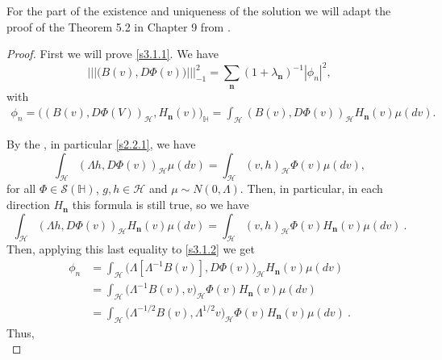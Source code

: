 \documentclass[review,onefignum,onetabnum]{siamart190516}
\begin{document}
        For the part of the existence and uniqueness of the solution we will 
    adapt the proof of the Theorem 5.2 in Chapter 9 from \cite{liu}.
    \begin{proof}
        First we will prove \eqref{s3.1.1}. We have
        $$
            ||| \big(B(v),D\Phi(v) \big) |||_{-1}^2 =\sum_{\mathbf{n}}
            (1+\lambda_{\mathbf{n}})^{-1}|\phi_n|^2 ,
        $$
        with
        \begin{align}
            \label{s3.1.2}
            \phi_n=
            \Big(
                (B(v),D\Phi(V))_{\mathcal{H}}, H_{\mathbf{n}}(v)
            \Big)_{\mathbb{H}}
            =\int_{\mathcal{H}} (B(v),D\Phi(v))_{\mathcal{H}} H_{\mathbf{n}}(v)
                \mu(dv).
        \end{align}
        
        By the , in particular \eqref{s2.2.1}, we have
        $$
            \int_{\mathcal{H}} (\Lambda h,D\Phi(v))_{\mathcal{H}}  \mu(dv) 
            =
                \int_{\mathcal{H}} (v,h)_{\mathcal{H}} \Phi(v)  \mu(dv) ,
        $$
        for all $\Phi\in \mathcal{S}(\mathbb{H})$, $g,h\in \mathcal{H}$ and 
        $\mu\sim N(0,\Lambda)$. Then, in particular, in each direction 
        $H_{\mathbf{n}}$ this formula is still true, so we have
        $$
            \int_{\mathcal{H}} 
                (\Lambda h,D\Phi(v))_{\mathcal{H}} H_{\mathbf{n}}(v)
                \mu(dv) =
            \int_{\mathcal{H}} (v,h)_{\mathcal{H}} \Phi(v) H_{\mathbf{n}}(v) 
            \mu(dv) \ .
        $$
        Then, applying this last equality to \eqref{s3.1.2} we get
        \begin{align*}
            \phi_n 
                &=\int_{\mathcal{H}}
                    \big(
                        \Lambda[\Lambda^{-1}B(v)],D\Phi(v)
                    \big)_{\mathcal{H}} H_{\mathbf{n}}(v)
                \mu(dv)\nonumber
            \\
                &= \int_{\mathcal{H}} 
                \big(
                    \Lambda^{-1}B(v), v 
                \big)_{\mathcal{H}} \Phi(v)
                H_{\mathbf{n}}(v) \mu(dv)\nonumber\\
                &= \int_{\mathcal{H}} 
                    \big(
                        \Lambda^{-1/2}B(v),\Lambda^{1/2}v
                    \big)_{\mathcal{H}} 
                    \Phi(v) H_{\mathbf{n}}(v) \mu(dv)
                    \ .
        \end{align*}
        Thus,
        \begin{equation}

\end{equation}
\end{proof}
\end{document}
